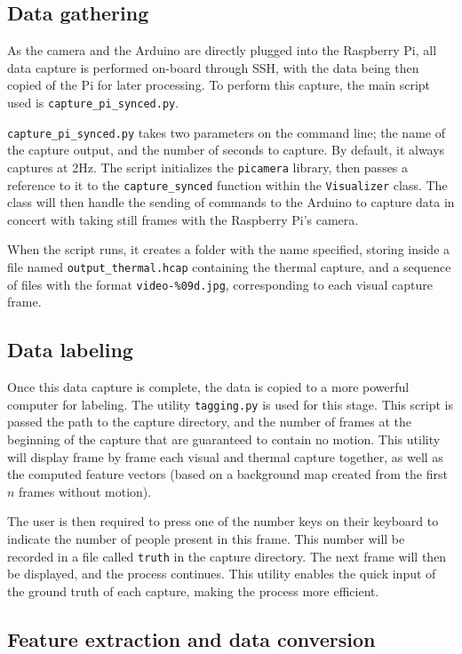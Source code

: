 \documentclass[../thesis/thesis.tex]{subfiles}
\begin{document}
\subsection{Data gathering}
As the camera and the Arduino are directly plugged into the Raspberry Pi, all data capture is performed on-board through SSH, with the data being then copied of the Pi for later processing. To perform this capture, the main script used is \texttt{capture\_pi\_synced.py}.

\texttt{capture\_pi\_synced.py} takes two parameters on the command line; the name of the capture output, and the number of seconds to capture. By default, it always captures at 2Hz. The script initializes the \texttt{picamera} library, then passes a reference to it to the \texttt{capture\_synced} function within the \texttt{Visualizer} class. The class will then handle the sending of commands to the Arduino to capture data in concert with taking still frames with the Raspberry Pi's camera.

When the script runs, it creates a folder with the name specified, storing inside a file named \texttt{output\_thermal.hcap} containing the thermal capture, and a sequence of files with the format \texttt{video-\%09d.jpg}, corresponding to each visual capture frame.

\subsection{Data labeling}
Once this data capture is complete, the data is copied to a more powerful computer for labeling. The utility \texttt{tagging.py} is used for this stage. This script is passed the path to the capture directory, and the number of frames at the beginning of the capture that are guaranteed to contain no motion. This utility will display frame by frame each visual and thermal capture together, as well as the computed feature vectors (based on a background map created from the first $n$ frames without motion).

The user is then required to press one of the number keys on their keyboard to indicate the number of people present in this frame. This number will be recorded in a file called \texttt{truth} in the capture directory. The next frame will then be displayed, and the process continues. This utility enables the quick input of the ground truth of each capture, making the process more efficient.

\subsection{Feature extraction and data conversion}
\end{document}
